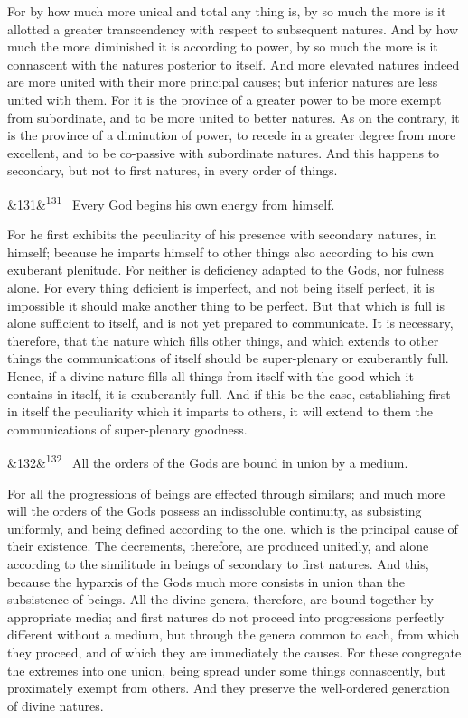 \documentclass[12pt]{article}
\newcommand{\para}[1][]{\par\noindent\ifx&#1&\else\textsuperscript{\footnotesize #1}~\fi}
\begin{document}
For by how much more unical and total any thing is, by so much the more is it allotted a greater transcendency with respect to subsequent natures. And by how much the more diminished it is according to power, by so much the more is it connascent with the natures posterior to itself. And more elevated natures indeed are more united with their more principal causes; but inferior natures are less united with them. For it is the province of a greater power to be more exempt from subordinate, and to be more united to better natures. As on the contrary, it is the province of a diminution of power, to recede in a greater degree from more excellent, and to be co-passive with subordinate natures. And this happens to secondary, but not to first natures, in every order of things.

\para[131] Every God begins his own energy from himself.

For he first exhibits the peculiarity of his presence with secondary natures, in himself; because he imparts himself to other things also according to his own exuberant plenitude. For neither is deficiency adapted to the Gods, nor fulness alone. For every thing deficient is imperfect, and not being itself perfect, it is impossible it should make another thing to be perfect. But that which is full is alone sufficient to itself, and is not yet prepared to communicate. It is necessary, therefore, that the nature which fills other things, and which extends to other things the communications of itself should be super-plenary or exuberantly full. Hence, if a divine nature fills all things from itself with the good which it contains in itself, it is exuberantly full. And if this be the case, establishing first in itself the peculiarity which it imparts to others, it will extend to them the communications of super-plenary goodness.

\para[132] All the orders of the Gods are bound in union by a medium.

For all the progressions of beings are effected through similars; and much more will the orders of the Gods possess an indissoluble continuity, as subsisting uniformly, and being defined according to the one, which is the principal cause of their existence. The decrements, therefore, are produced unitedly, and alone according to the similitude in beings of secondary to first natures. And this, because the hyparxis of the Gods much more consists in union than the subsistence of beings. All the divine genera, therefore, are bound together by appropriate media; and first natures do not proceed into progressions perfectly different without a medium, but through the genera common to each, from which they proceed, and of which they are immediately the causes. For these congregate the extremes into one union, being spread under some things connascently, but proximately exempt from others. And they preserve the well-ordered generation of divine natures.
\end{document}
